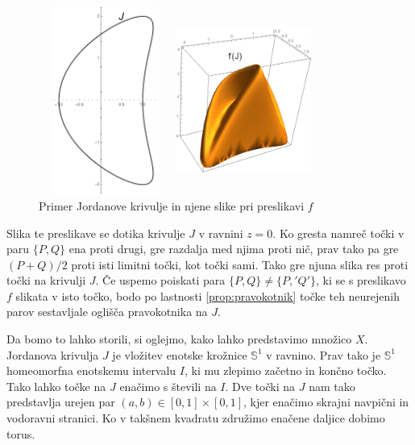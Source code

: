 \documentclass[mat1]{fmfdelo}
\begin{document}
\begin{figure}[h!]
\begin{minipage}{0.45\textwidth}
	\centering
	\includegraphics[width = 125pt, height = 175pt]{primer_krivulje.png}
\end{minipage}\hfill
\begin{minipage}{0.45\textwidth}
	\centering
	\includegraphics[width = 125pt, height = 175pt]{primer_f_krivulje.png}
\end{minipage}
\caption{Primer Jordanove krivulje in njene slike pri preslikavi $f$}
\end{figure}

Slika te preslikave se dotika krivulje $J$ v ravnini $z=0$. Ko gresta namreč točki v paru $\{P, Q\}$ ena proti drugi, gre razdalja med njima proti nič, prav tako pa gre $(P+Q)/2$ proti isti limitni točki, kot točki sami. Tako gre njuna slika res proti točki na krivulji $J$.
Če uspemo poiskati para $\{P, Q\} \neq \{P,' Q'\}$, ki se s preslikavo $f$ slikata v isto točko, bodo po lastnosti \eqref{prop:pravokotnik} točke teh neurejenih parov sestavljale oglišča pravokotnika na $J$.

Da bomo to lahko storili, si oglejmo, kako lahko predstavimo množico $X$. Jordanova krivulja $J$ je vložitev enotske krožnice $\mathbb{S}^1$ v ravnino. Prav tako je $\mathbb{S}^1$ homeomorfna enotskemu intervalu $I$, ki mu zlepimo začetno in končno točko. Tako lahko točke na $J$ enačimo s števili na $I$. Dve točki na $J$ nam tako predstavlja urejen par $(a, b) \in [0, 1] \times [0, 1]$, kjer enačimo skrajni navpični in vodoravni stranici. Ko v takšnem kvadratu združimo enačene daljice dobimo torus.
\end{document}
